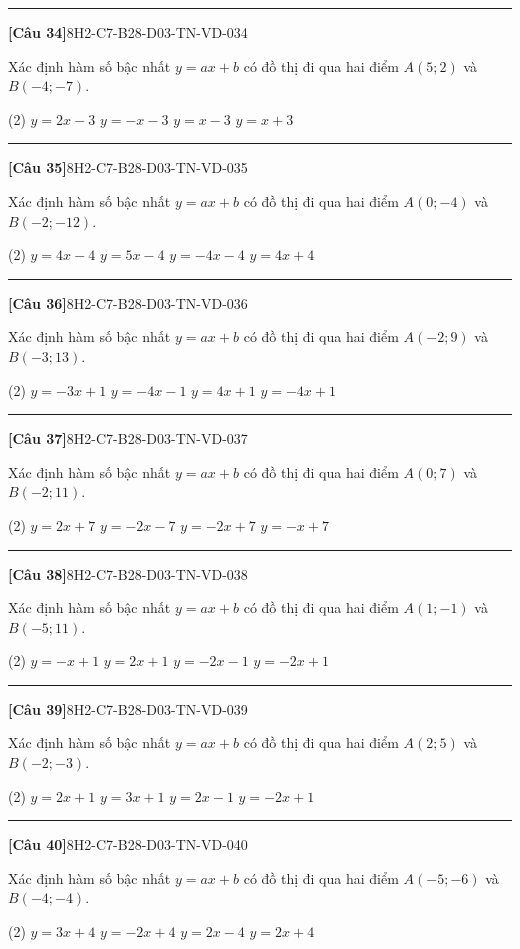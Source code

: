 \documentclass[12pt,a4paper]{article}
\newif\ifloigiai
\newenvironment{cauhoi}[2]{%
  \par\medskip\noindent\rule{\textwidth}{0.4pt}\par\nopagebreak
  \noindent\textbf{[#1]}\hfill{\scriptsize\ttfamily #2}\par\nopagebreak\smallskip}{\par}
\newcommand{\dapan}[1]{\ifloigiai\par\smallskip\noindent\textit{Đáp án:} \textbf{#1}\par\fi}
\begin{document}
\begin{cauhoi}{Câu 34}{8H2-C7-B28-D03-TN-VD-034}
Xác định hàm số bậc nhất $y=ax+b$ có đồ thị đi qua hai điểm $A(5;2)$ và $B(-4;-7)$.
\begin{tasks}(2)
\task $y=2x-3$
\task $y=-x-3$
\task $y=x-3$
\task $y=x+3$
\end{tasks}
\dapan{C}
\end{cauhoi}
\begin{cauhoi}{Câu 35}{8H2-C7-B28-D03-TN-VD-035}
Xác định hàm số bậc nhất $y=ax+b$ có đồ thị đi qua hai điểm $A(0;-4)$ và $B(-2;-12)$.
\begin{tasks}(2)
\task $y=4x-4$
\task $y=5x-4$
\task $y=-4x-4$
\task $y=4x+4$
\end{tasks}
\dapan{A}
\end{cauhoi}
\begin{cauhoi}{Câu 36}{8H2-C7-B28-D03-TN-VD-036}
Xác định hàm số bậc nhất $y=ax+b$ có đồ thị đi qua hai điểm $A(-2;9)$ và $B(-3;13)$.
\begin{tasks}(2)
\task $y=-3x+1$
\task $y=-4x-1$
\task $y=4x+1$
\task $y=-4x+1$
\end{tasks}
\dapan{D}
\end{cauhoi}
\begin{cauhoi}{Câu 37}{8H2-C7-B28-D03-TN-VD-037}
Xác định hàm số bậc nhất $y=ax+b$ có đồ thị đi qua hai điểm $A(0;7)$ và $B(-2;11)$.
\begin{tasks}(2)
\task $y=2x+7$
\task $y=-2x-7$
\task $y=-2x+7$
\task $y=-x+7$
\end{tasks}
\dapan{C}
\end{cauhoi}
\begin{cauhoi}{Câu 38}{8H2-C7-B28-D03-TN-VD-038}
Xác định hàm số bậc nhất $y=ax+b$ có đồ thị đi qua hai điểm $A(1;-1)$ và $B(-5;11)$.
\begin{tasks}(2)
\task $y=-x+1$
\task $y=2x+1$
\task $y=-2x-1$
\task $y=-2x+1$
\end{tasks}
\dapan{D}
\end{cauhoi}
\begin{cauhoi}{Câu 39}{8H2-C7-B28-D03-TN-VD-039}
Xác định hàm số bậc nhất $y=ax+b$ có đồ thị đi qua hai điểm $A(2;5)$ và $B(-2;-3)$.
\begin{tasks}(2)
\task $y=2x+1$
\task $y=3x+1$
\task $y=2x-1$
\task $y=-2x+1$
\end{tasks}
\dapan{A}
\end{cauhoi}
\begin{cauhoi}{Câu 40}{8H2-C7-B28-D03-TN-VD-040}
Xác định hàm số bậc nhất $y=ax+b$ có đồ thị đi qua hai điểm $A(-5;-6)$ và $B(-4;-4)$.
\begin{tasks}(2)
\task $y=3x+4$
\task $y=-2x+4$
\task $y=2x-4$
\task $y=2x+4$
\end{tasks}
\dapan{D}
\end{cauhoi}
\end{document}
